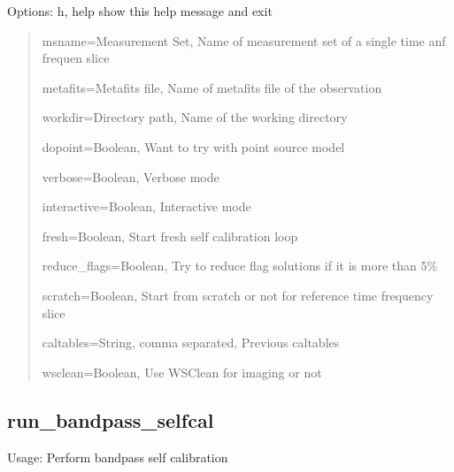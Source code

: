 \documentclass[letterpaper,10pt,english]{sphinxmanual}
\begin{document}
\sphinxAtStartPar
Options: \sphinxhyphen{}h, \sphinxhyphen{}\sphinxhyphen{}help                            show this help message and exit
\begin{quote}

\sphinxAtStartPar
\sphinxhyphen{}\sphinxhyphen{}msname=Measurement Set,              Name of measurement set of a single time anf frequen slice

\sphinxAtStartPar
\sphinxhyphen{}\sphinxhyphen{}metafits=Metafits file,              Name of metafits file of the observation

\sphinxAtStartPar
\sphinxhyphen{}\sphinxhyphen{}workdir=Directory path,              Name of the working directory

\sphinxAtStartPar
\sphinxhyphen{}\sphinxhyphen{}dopoint=Boolean,                     Want to try with point source model

\sphinxAtStartPar
\sphinxhyphen{}\sphinxhyphen{}verbose=Boolean,                     Verbose mode

\sphinxAtStartPar
\sphinxhyphen{}\sphinxhyphen{}interactive=Boolean,                 Interactive mode

\sphinxAtStartPar
\sphinxhyphen{}\sphinxhyphen{}fresh=Boolean,                       Start fresh self calibration loop

\sphinxAtStartPar
\sphinxhyphen{}\sphinxhyphen{}reduce\_flags=Boolean,               Try to reduce flag solutions if it is more than 5\%

\sphinxAtStartPar
\sphinxhyphen{}\sphinxhyphen{}scratch=Boolean,                     Start from scratch or not for reference time frequency slice

\sphinxAtStartPar
\sphinxhyphen{}\sphinxhyphen{}caltables=String, comma separated, Previous caltables

\sphinxAtStartPar
\sphinxhyphen{}\sphinxhyphen{}wsclean=Boolean,                     Use WSClean for imaging or not
\end{quote}


\subsection{run\_bandpass\_selfcal}
\label{\detokenize{scripts:run-bandpass-selfcal}}
\sphinxAtStartPar
Usage:  Perform bandpass self calibration
\end{document}

